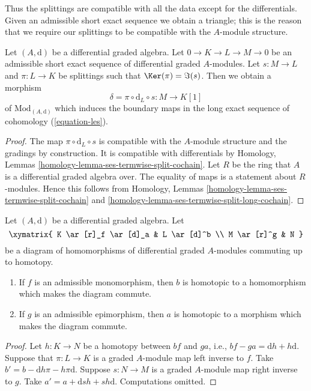 \noindent
Thus the splittings are compatible with all the data except for
the differentials. Given an admissible short exact sequence we
obtain a triangle; this is the reason that we require our splittings
to be compatible with the $A$-module structure.

\begin{lemma}
\label{lemma-admissible-ses}
Let $(A, \text{d})$ be a differential graded algebra.
Let $0 \to K \to L \to M \to 0$ be an admissible short exact sequence
of differential graded $A$-modules. Let $s : M \to L$ and $\pi : L \to K$
be splittings such that $\Ker(\pi) = \Im(s)$.
Then we obtain a morphism
$$
\delta = \pi \circ \text{d}_L \circ s : M \to K[1]
$$
of $\text{Mod}_{(A, \text{d})}$ which induces the boundary maps
in the long exact sequence of cohomology (\ref{equation-les}).
\end{lemma}

\begin{proof}
The map $\pi \circ \text{d}_L \circ s$ is compatible with the $A$-module
structure and the gradings by construction. It is compatible with
differentials by Homology, Lemmas
\ref{homology-lemma-ses-termwise-split-cochain}.
Let $R$ be the ring that $A$ is a differential graded algebra over.
The equality of maps is a statement about $R$-modules. Hence this
follows from Homology, Lemmas
\ref{homology-lemma-ses-termwise-split-cochain} and
\ref{homology-lemma-ses-termwise-split-long-cochain}.
\end{proof}

\begin{lemma}
\label{lemma-make-commute-map}
Let $(A, \text{d})$ be a differential graded algebra. Let
$$
\xymatrix{
K \ar[r]_f \ar[d]_a & L \ar[d]^b \\
M \ar[r]^g & N
}
$$
be a diagram of homomorphisms of differential graded $A$-modules
commuting up to homotopy.
\begin{enumerate}
\item If $f$ is an admissible monomorphism, then $b$ is homotopic to a
homomorphism which makes the diagram commute.
\item If $g$ is an admissible epimorphism, then $a$ is homotopic to a
morphism which makes the diagram commute.
\end{enumerate}
\end{lemma}

\begin{proof}
Let $h : K \to N$ be a homotopy between $bf$ and $ga$, i.e.,
$bf - ga = \text{d}h + h\text{d}$. Suppose that $\pi : L \to K$
is a graded $A$-module map left inverse to $f$. Take
$b' = b - \text{d}h\pi - h\pi \text{d}$.
Suppose $s : N \to M$ is a graded $A$-module map right inverse to $g$.
Take $a' = a + \text{d}sh + sh\text{d}$.
Computations omitted.
\end{proof}

